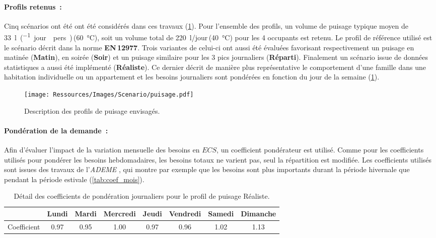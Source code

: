 \paragraph{Profils retenus~:} %
\label{par:profils_retenus}
Cinq scénarios ont été ont été considérés dans ces travaux (\ref{fig:profil_puisage}). Pour
l’ensemble des profils, un volume de puisage typique moyen de
\SI{33}{\litre\per(jour\period pers)}\,(\SI{60}{\celsius}), soit un
volume total de \SI{220}{\litre/jour}\,(\SI{40}{\celsius}) pour les 4 occupants est
retenu. Le profil de référence utilisé est le scénario décrit dans la norme
\textbf{EN\,12977}. Trois variantes de celui-ci ont aussi été évaluées favorisant
respectivement un puisage en matinée (\textbf{Matin}), en soirée (\textbf{Soir}) et un
puisage similaire pour les 3 pics journaliers (\textbf{Réparti}). Finalement un scénario
issue de données statistiques \parencite{ADEME2016} a aussi été implémenté
(\textbf{Réaliste}). Ce dernier décrit de manière plus représentative le comportement
d’une famille dans une habitation individuelle ou un appartement et les besoins
journaliers sont pondérées en fonction du jour de la semaine (\ref{tab:coef_semaine}).
\begin{figure}
    \begin{center}
        \texttt{[image: Ressources/Images/Scenario/puisage.pdf]}
    \end{center}
    \caption{Description des profils de puisage envisagés.
             \label{fig:profil_puisage}}
\end{figure}

\paragraph{Pondération de la demande~:} %
\label{par:ponderation_de_la_demande}
Afin d’évaluer l’impact de la variation mensuelle des besoins en $ECS$, un
coefficient pondérateur est utilisé. Comme pour les coefficients utilisés pour pondérer
les besoins hebdomadaires, les besoins totaux ne varient pas, seul la répartition est
modifiée. Les coefficients utilisés sont issues des travaux de l’\textit{ADEME}
\parencite{ADEME2016}, qui montre par exemple que les besoins sont plus importants durant
la période hivernale que pendant la période estivale (\ref{tab:coef_mois}).

\begin{table}
\centering
\begin{tabular}{l*{7}{c}}
    \toprule
                & Lundi & Mardi & Mercredi & Jeudi & Vendredi & Samedi & Dimanche \\
    \midrule
    Coefficient & \num{0.97}  & \num{0.95}  & \num{1.00}     & \num{0.97}  & \num{0.96}     & \num{1.02}   & \num{1.13}     \\
    \bottomrule
\end{tabular}
\caption{Détail des coefficients de pondération journaliers pour le profil de
         puisage Réaliste.}
         \label{tab:coef_semaine}
\end{table}

